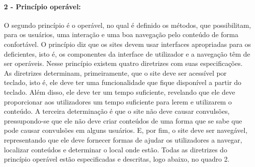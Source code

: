\documentclass[a4paper]{article}
\begin{document}
\begin{titlepage}
\paragraph{2 - Princípio operável: }

O segundo princípio é o operável, no qual é definido os métodos, que possibilitam, para os usuários, uma interação e uma boa navegação pelo conteúdo de forma confortável. O princípio diz que os sites devem usar interfaces apropriadas para os deficientes, isto é, os componentes da interface de utilizador e a navegação têm de ser operáveis. Nesse princípio existem quatro diretrizes com suas especificações. As diretrizes determinam, primeiramente, que o site deve ser acessível por teclado, isto é, ele deve ter uma funcionalidade que fique disponível a partir do teclado. Além disso, ele deve ter um tempo suficiente, revelando que ele deve proporcionar aos utilizadores um tempo suficiente para lerem e utilizarem o conteúdo. A terceira determinação é que o site não deve causar convulsões, pressupondo-se que ele não deve criar conteúdos de uma forma que se sabe que pode causar convulsões em alguns usuários. E, por fim, o site deve ser navegável, representando que ele deve fornecer formas de ajudar os utilizadores a navegar, localizar conteúdos e determinar o local onde estão. Todas as diretrizes do princípio operável estão especificadas e descritas, logo abaixo, no quadro 2.


\end{titlepage}
\end{document}
